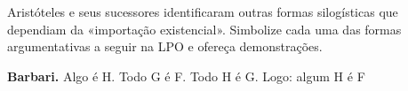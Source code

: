 \problempart
\label{pr.BarbaraEtc.proof2}
Aristóteles e seus sucessores identificaram outras formas silogísticas que dependiam da «importação existencial». Simbolize cada uma das formas argumentativas a seguir na LPO e ofereça demonstrações.
\begin{compactlist}
\newpage	\item \textbf{Barbari.} Algo é H. Todo G é F. Todo H é G. Logo: algum H é F
	\\


\end{compactlist}
